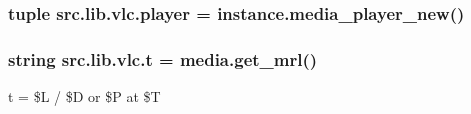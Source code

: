 \subsubsection[{player}]{\setlength{\rightskip}{0pt plus 5cm}tuple src.\+lib.\+vlc.\+player = instance.\+media\+\_\+player\+\_\+new()}\label{namespacesrc_1_1lib_1_1vlc_a3245e13ab40950beac9bda1e4091c4fa}
\hypertarget{namespacesrc_1_1lib_1_1vlc_add0e418f8af011e4410708a76ed1e862}{}
\subsubsection[{t}]{\setlength{\rightskip}{0pt plus 5cm}string src.\+lib.\+vlc.\+t = media.\+get\+\_\+mrl()}\label{namespacesrc_1_1lib_1_1vlc_add0e418f8af011e4410708a76ed1e862}


t = \textquotesingle{}\$\+L / \$\+D or \$\+P at \$\+T\textquotesingle{} 

